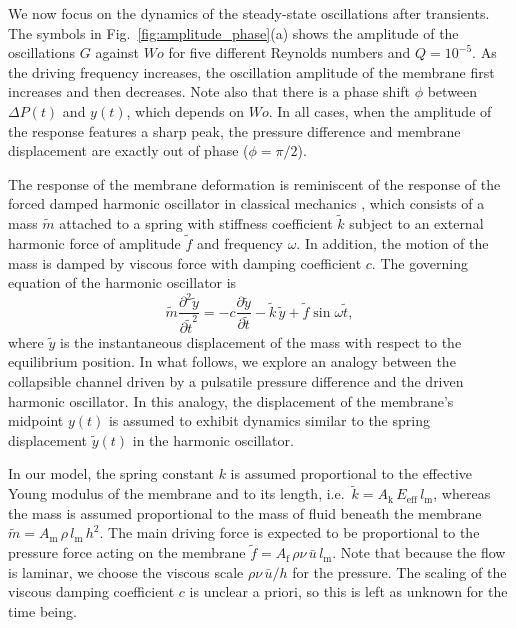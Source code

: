 \documentclass[aps,prl,reprint,superscriptaddress,floatfix]{revtex4-1}
\newcommand{\Wo}{\mathit{Wo}}
\begin{document}
We now focus on the dynamics of the steady-state oscillations after transients. The symbols in Fig.~\ref{fig:amplitude_phase}(a) shows the amplitude of the oscillations $G$ against $\Wo$ for five different Reynolds numbers and $Q=10^{-5}$. As the driving frequency increases, the oscillation amplitude of the membrane first increases and then decreases. Note also that there is a phase shift $\phi$ between $\Delta P(t)$ and $y(t)$, which depends on $\Wo$. In all cases, when the amplitude of the response features a sharp peak, the pressure difference and membrane displacement are exactly out of phase ($\phi=\pi/2$).  

The response of the membrane deformation is reminiscent of the response of the forced damped harmonic oscillator in classical mechanics \cite{Shabana91}, which consists of a mass $\widetilde{m}$ attached to a spring with stiffness coefficient $\widetilde{k}$ subject to an external harmonic force of amplitude $\widetilde f$ and frequency $\omega$. In addition, the motion of the mass is damped by viscous force with damping coefficient $c$. The governing equation of the harmonic oscillator is
\begin{equation}
\widetilde m\frac{\partial^2 \widetilde y}{\partial {\widetilde t}^2}=-c\frac{\partial \widetilde y}{\partial \widetilde t}-\widetilde k\,\widetilde y+\widetilde f\sin  \omega \widetilde t,
\label{eq:oscillator_eqn}
\end{equation}	
where $\widetilde y$ is the instantaneous displacement of the mass with respect to the equilibrium position. In what follows, we explore an analogy between the collapsible channel driven by a pulsatile pressure difference and the driven harmonic oscillator. In this analogy, the displacement of the membrane's midpoint $y(t)$ is assumed to exhibit dynamics similar to the spring displacement $\widetilde y(t)$ in the harmonic oscillator. 

In our model, the spring constant $k$ is assumed proportional to the effective Young modulus of the membrane and to its length, i.e.~$\tilde k=A_\text{k}\, E_\text{eff}\,l_\text{m}$, whereas the mass is assumed proportional to the mass of fluid beneath the membrane $\tilde m=A_\text{m}\, \rho\, l_\text{m}\, h^2$. The main driving force is expected to be proportional to the pressure force acting on the membrane $\tilde f=A_\text{f}\,\rho\nu\, \bar{u}\, l_\text{m}$. Note that because the flow is laminar, we choose the viscous scale $\rho\nu\, \bar{u}/h$ for the pressure. The scaling of the viscous damping coefficient $c$ is unclear a priori, so this is left as unknown for the time being. 
\end{document}

